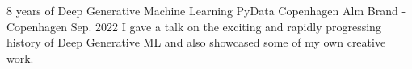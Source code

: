 

\begin{cventries}

  \cventry
    {8 years of Deep Generative Machine Learning} %
    {PyData Copenhagen} %
    {Alm Brand - Copenhagen} %
    {Sep. 2022} %
    {
      I gave a talk on the exciting and rapidly progressing history of Deep Generative ML and also showcased some of my own creative work.
    }

\end{cventries}